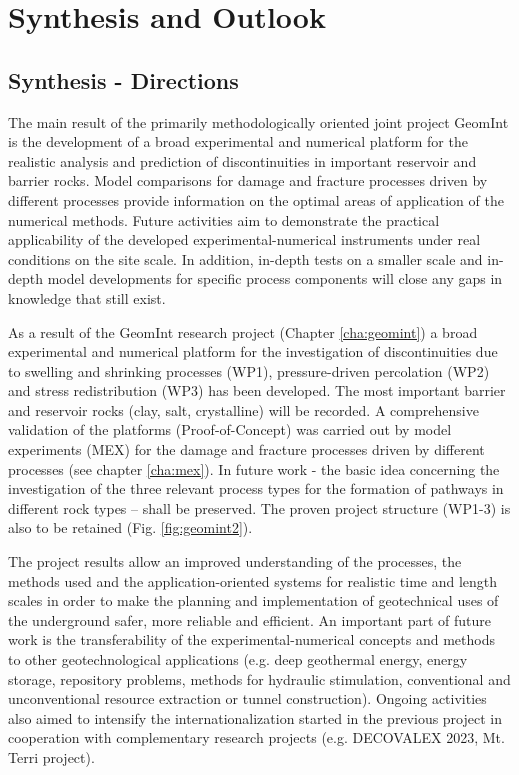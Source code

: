 \chapter{Synthesis and Outlook}
\label{cha:out}

\section{Synthesis - Directions}

The main result of the primarily methodologically oriented joint project GeomInt is the development of a broad experimental and numerical platform for the realistic analysis and prediction of discontinuities in important reservoir and barrier rocks. Model comparisons for damage and fracture processes driven by different processes provide information on the optimal areas of application of the numerical methods.
Future activities aim to demonstrate the practical applicability of the developed experimental-numerical instruments under real conditions on the site scale. In addition, in-depth tests on a smaller scale and in-depth model developments for specific process components will close any gaps in knowledge that still exist.

As a result of the GeomInt research project (Chapter \ref{cha:geomint}) a broad experimental and numerical platform for the investigation of discontinuities due to swelling and shrinking processes (WP1), pressure-driven percolation (WP2) and stress redistribution (WP3) has been developed. The most important barrier and reservoir rocks (clay, salt, crystalline) will be recorded. A comprehensive validation of the platforms (\glqq{}Proof-of-Concept\grqq) was carried out by model experiments (MEX) for the damage and fracture processes driven by different processes (see chapter \ref{cha:mex}).
In future work - the basic idea concerning the investigation of the three relevant process types for the formation of pathways in different rock types -- shall be preserved. The proven project structure (WP1-3) is also to be retained (Fig. \ref{fig:geomint2}).

The project results allow an improved understanding of the processes, the methods used and the application-oriented systems for realistic time and length scales in order to make the planning and implementation of geotechnical uses of the underground safer, more reliable and efficient. An important part of future work is the transferability of the experimental-numerical concepts and methods to other geotechnological applications (e.g. deep geothermal energy, energy storage, repository problems, methods for hydraulic stimulation, conventional and unconventional resource extraction or tunnel construction). Ongoing activities also aimed to intensify the internationalization started in the previous project in cooperation with complementary research projects (e.g. DECOVALEX 2023, Mt. Terri project).

